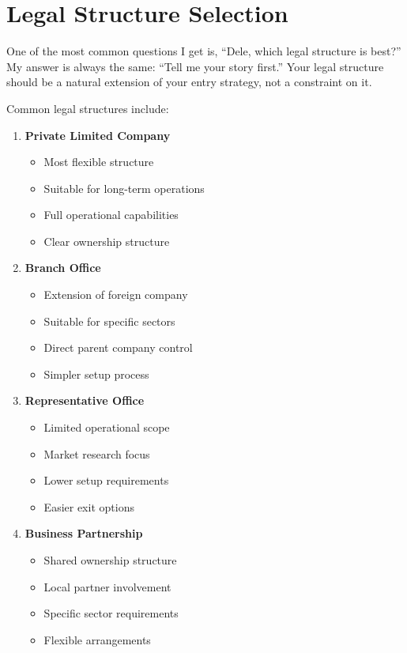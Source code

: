 \section{Legal Structure Selection}\label{sec:legal-structure-selection}

One of the most common questions I get is, ``Dele, which legal structure is best?'' My answer is always the same: ``Tell me your story first.'' Your legal structure should be a natural extension of your entry strategy, not a constraint on it.

Common legal structures include:
\begin{enumerate}
    \item \textbf{Private Limited Company}
    \begin{itemize}
        \item Most flexible structure
        \item Suitable for long-term operations
        \item Full operational capabilities
        \item Clear ownership structure
    \end{itemize}
    \item \textbf{Branch Office}
    \begin{itemize}
        \item Extension of foreign company
        \item Suitable for specific sectors
        \item Direct parent company control
        \item Simpler setup process
    \end{itemize}
    \item \textbf{Representative Office}
    \begin{itemize}
        \item Limited operational scope
        \item Market research focus
        \item Lower setup requirements
        \item Easier exit options
    \end{itemize}
    \item \textbf{Business Partnership}
    \begin{itemize}
        \item Shared ownership structure
        \item Local partner involvement
        \item Specific sector requirements
        \item Flexible arrangements
    \end{itemize}
\end{enumerate}


